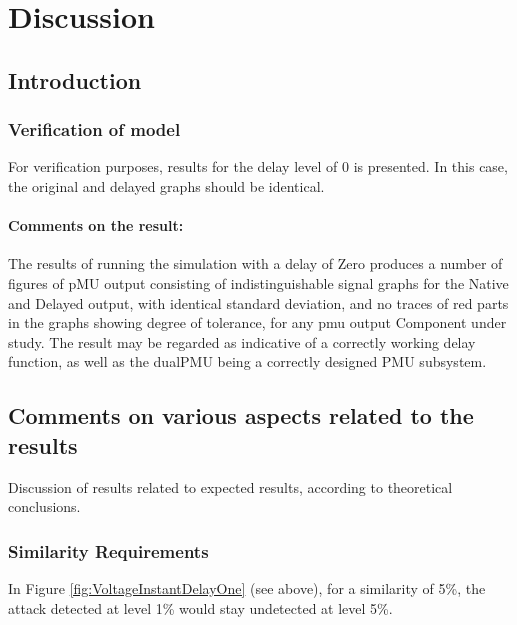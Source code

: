\chapter{Discussion} \label{chap:Discussions}



\section{Introduction}


\subsection{Verification of model}

For verification purposes, results for the delay level of 0 is presented.  In this case, the original and delayed graphs should be identical.
\subsubsection{Comments on the result:}
The results of running the simulation with a delay of Zero produces a number of figures of pMU output consisting of indistinguishable signal graphs for the Native and Delayed output, with identical standard deviation, and no traces of red parts in the graphs showing degree of tolerance, for any \acrshort{pmu} output Component under study. The result may be regarded as indicative of a correctly working delay function, as well as the dualPMU being a correctly designed PMU subsystem. 




\section{Comments on various aspects related to the results}

Discussion of results related to expected results, according to theoretical conclusions.





\subsection{Similarity Requirements}
In Figure \ref{fig:VoltageInstantDelayOne} (see above), for a similarity of 5\%, the attack detected  at level 1\% would stay undetected at level 5\%. 